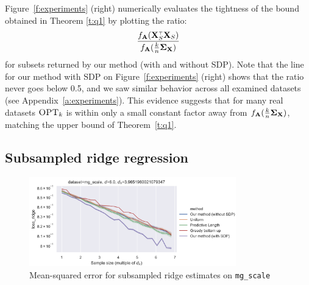 Figure~\ref{f:experiments} (right) numerically evaluates the tightness of the
bound obtained in Theorem \ref{t:q1} by plotting the ratio:
\[\frac{f_{\A}(\X_S^\top \X_S)}{ f_{\A}(\frac{k}{n}\Sigmab_\X)}\]
for subsets returned by our method (with and without SDP). Note that the
line for our method with SDP on
Figure~\ref{f:experiments} (right) shows that the ratio never goes
below 0.5, and we saw similar behavior across all examined datasets
(see Appendix~\ref{a:experiments}). This evidence suggests that for
    many real datasets ${\textsc{OPT}_k}$ is within only a small constant factor
    away from $f_{\mathbf A}(\frac{k}{n}\mathbf{\Sigma}_\mathbf X)$, matching the upper bound of
    Theorem~\ref{t:q1}.


\subsection{Subsampled ridge regression}

\begin{figure}[htbp]
    \centering
    \includegraphics[width=0.8\textwidth]{bayesian_figures/mg_scale_ridge.pdf}
    \caption{Mean-squared error for subsampled ridge estimates
        on \texttt{mg\_scale}
    }
    \label{fig:low_d_eff}
\end{figure}

